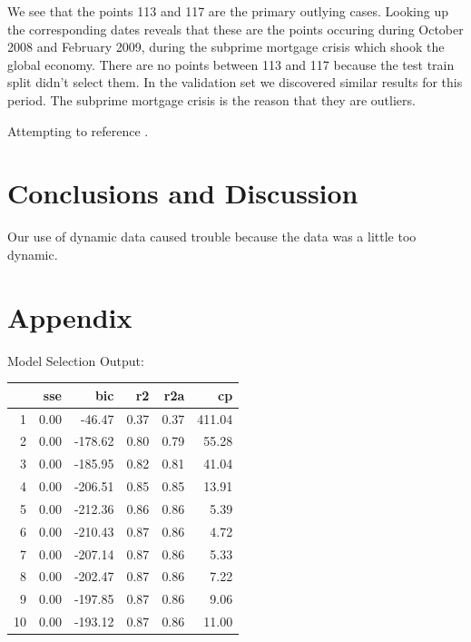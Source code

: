 \documentclass[12pt]{article}
\begin{document}
We see
that the points 113 and 117 are the primary outlying cases. Looking up the
corresponding dates reveals that these are the points occuring during
October 2008 and February 2009, during the subprime mortgage crisis
which shook the global economy. There are no points between 113 and 117
because the test train split didn't select them. In the validation set we
discovered similar results for this period. The subprime mortgage crisis is
the reason that they are outliers.



Attempting to reference \cite{lamport94}.

\section{Conclusions and Discussion}

Our use of dynamic data caused trouble because the data was a little too
dynamic.

\newpage
\section{Appendix}

Model Selection Output:
\begin{table}[ht]
\centering
\begin{tabular}{rrrrrr}
  \hline
 & sse & bic & r2 & r2a & cp \\
  \hline
1 & 0.00 & -46.47 & 0.37 & 0.37 & 411.04 \\
  2 & 0.00 & -178.62 & 0.80 & 0.79 & 55.28 \\
  3 & 0.00 & -185.95 & 0.82 & 0.81 & 41.04 \\
  4 & 0.00 & -206.51 & 0.85 & 0.85 & 13.91 \\
  5 & 0.00 & -212.36 & 0.86 & 0.86 & 5.39 \\
  6 & 0.00 & -210.43 & 0.87 & 0.86 & 4.72 \\
  7 & 0.00 & -207.14 & 0.87 & 0.86 & 5.33 \\
  8 & 0.00 & -202.47 & 0.87 & 0.86 & 7.22 \\
  9 & 0.00 & -197.85 & 0.87 & 0.86 & 9.06 \\
  10 & 0.00 & -193.12 & 0.87 & 0.86 & 11.00 \\
   \hline
\end{tabular}
\end{table}


\listoffigures
\end{document}
